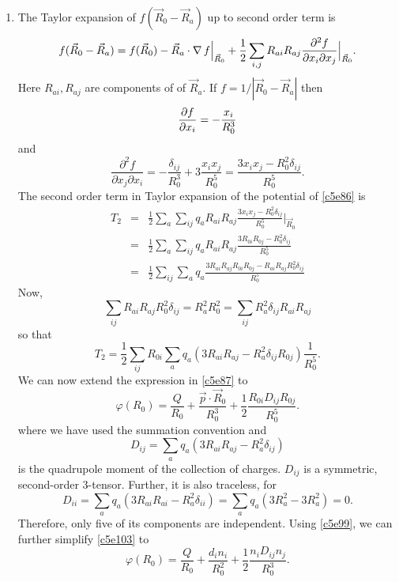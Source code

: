 \begin{enumerate}
\item The Taylor expansion of $f(\vec{R}_0-\vec{R}_a)$ up to second order term 
is
\begin{equation}\label{c5e102}
f(\vec{R}_0-\vec{R}_a) = f(\vec{R}_0) - \vec{R}_a\cdot\operatorname{\nabla} f\Big|_{\vec{R}_0} +
\frac{1}{2}\sum_{i, j}R_{ai}R_{aj}
\frac{\partial^2 f}{\partial x_i\partial x_j}\Big|_{\vec{R}_0}.
\end{equation}
Here $R_{ai}, R_{aj}$ are components of of $\vec{R}_a$.
If $f = 1/|\vec{R}_0-\vec{R}_a|$ then
\[
\frac{\partial{f}}{\partial{x_i}} = -\frac{x_i}{R_0^3}
\]
and
\[
\frac{\partial^2 f}{\partial x_j\partial x_i} = -\frac{\delta_{ij}}{R_0^3} + 
3\frac{x_ix_j}{R_0^5} = \frac{3x_ix_j - R_0^2\delta_{ij}}{R_0^5}.
\]
The second order term in Taylor expansion of the potential of \eqref{c5e86} is
\begin{eqnarray*}
T_2 &=& \frac{1}{2}\sum_a\sum_{ij} q_aR_{ai}R_{aj}
	\frac{3x_ix_j - R_0^2\delta_{ij}}{R_0^5}\Big|_{\vec{R}_0} \\
 &=& \frac{1}{2}\sum_a\sum_{ij} q_aR_{ai}R_{aj}\frac{3R_{0i}R_{0j} - 
 	R_0^2\delta_{ij}}{R_0^5} \\
 &=& \frac{1}{2}\sum_{ij}\sum_a q_a
  \frac{3R_{ai}R_{aj}R_{0i}R_{0j} - R_{ai}R_{aj}R_0^2\delta_{ij}}{R_0^5}
\end{eqnarray*}
Now,
\[
\sum_{ij}R_{ai}R_{aj}R_0^2\delta_{ij} = R_a^2R_0^2 = 
\sum_{ij}R_a^2\delta_{ij}R_{ai}R_{aj}
\]
so that
\[
T_2 = \frac{1}{2}\sum_{ij}R_{0i}\sum_a 
q_a(3R_{ai}R_{aj} - R_a^2\delta_{ij}R_{0j})\frac{1}{R_0^5}.
\]
We can now extend the expression in \eqref{c5e87} to
\begin{equation}\label{c5e103}
\varphi(R_0) = \frac{Q}{R_0} + \frac{\vec{p}\cdot\vec{R}_0}{R_0^3} + 
\frac{1}{2}\frac{R_{0i}D_{ij}R_{0j}}{R_0^5}.
\end{equation}
where we have used the summation convention and
\begin{equation}\label{c5e104}
D_{ij} = \sum_a q_a(3R_{ai}R_{aj} - R_a^2\delta_{ij})
\end{equation}
is the quadrupole moment of the collection of charges. $D_{ij}$ is a symmetric,
second-order 3-tensor. Further, it is also traceless, for
\[
D_{ii} = \sum_a q_a(3R_{ai}R_{ai} - R_a^2\delta_{ii}) = 
\sum_a q_a(3R_a^2 - 3R_a^2) = 0.
\]
Therefore, only five of its components are independent. Using \eqref{c5e99}, we
can further simplify \eqref{c5e103} to
\begin{equation}\label{c5e105}
\varphi(R_0) = \frac{Q}{R_0} + \frac{d_in_i}{R_0^2} + 
\frac{1}{2}\frac{n_iD_{ij}n_j}{R_0^3}.
\end{equation}


\end{enumerate}
